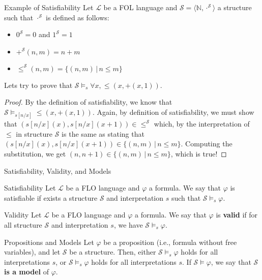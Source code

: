 \documentclass[aspectratio=169]{beamer}
\begin{document}
\begin{slide}{Example of Satisfiability}
Let $\mathcal{L}$ be a FOL language and $\mathcal{S} = \langle \mathbb{N},\cdot^\mathcal{S} \rangle$ a structure such that $\cdot^\mathcal{S}$ is defined as follows:
\begin{itemize}
  \item $0^\mathcal{S} = 0$ and $1^\mathcal{S} = 1$
  \item $+^\mathcal{S}(n,m) = n + m$
  \item $\leq^\mathcal{S}(n,m) = \{ (n,m) \,|\, n \leq m \}$
\end{itemize}
Lets try to prove that $\mathcal{S} \models_s \forall x, \leq(x,+(x,1))$.
\begin{proof}
By the definition of satisfiability, we know that $\mathcal{S} \models_{s[n/x]} \leq(x,+(x,1))$. Again, by definition of satisfiability, we must show that $(s[n/x](x),s[n/x](x+1)) \in \leq^\mathcal{S}$ which, by the interpretation of $\leq$ in structure $\mathcal{S}$ is the same as stating that $(s[n/x](x),s[n/x](x+1)) \in \{ (n,m) \,|\, n \leq m \}$. Computing the substitution, we get $(n,n+1) \in \{ (n,m) \,|\, n \leq m \}$, which is true!
\end{proof}

\end{slide}

\begin{slide}{Satisfiability, Validity, and Models}
\begin{block}{Satisfiability}
Let $\mathcal{L}$ be a FLO language and $\varphi$ a formula. We say that $\varphi$ is satisfiable if exists a structure $\mathcal{S}$ and interpretation $s$ such that $\mathcal{S} \models_s \varphi$.
\end{block}

\begin{block}{Validity}
Let $\mathcal{L}$ be a FLO language and $\varphi$ a formula. We say that $\varphi$ is \textbf{valid} if for all structure $\mathcal{S}$ and interpretation $s$, we have $\mathcal{S} \models_s \varphi$.
\end{block}

\begin{block}{Propositions and Models}
Let $\varphi$ be a proposition (i.e., formula without free variables), and let $\mathcal{S}$ be a structure. Then, either $\mathcal{S} \models_s \varphi$ holds for all interpretations $s$, or
$\mathcal{S} \models_s \varphi$ holds for all interpretations $s$. If $\mathcal{S} \models \varphi$, we say that $\mathcal{S}$ \textbf{is a model} of $\varphi$.
\end{block}
\end{slide}
\end{document}
